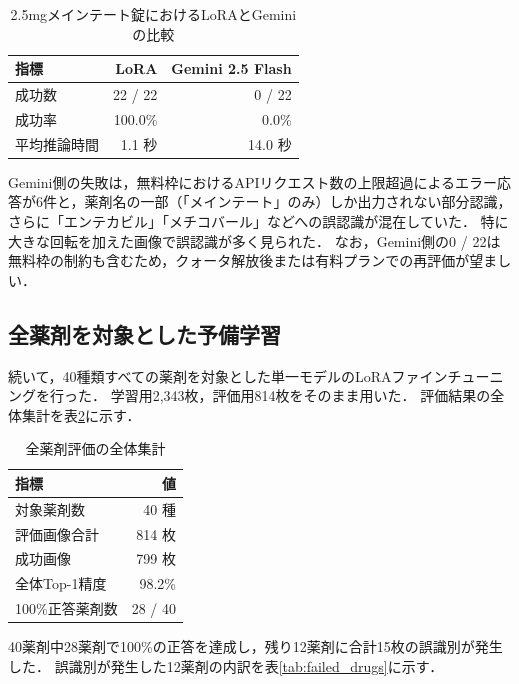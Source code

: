 \documentclass{jsarticle}
\begin{document}
\begin{table}[h]
\centering
\caption{2.5mgメインテート錠におけるLoRAとGeminiの比較}
\label{tab:vs_gemini}
\begin{tabular}{lrr}
\hline
指標 & LoRA & Gemini 2.5 Flash \\
\hline
成功数 & 22 / 22 & 0 / 22 \\
成功率 & 100.0\% & 0.0\% \\
平均推論時間 & 1.1 秒 & 14.0 秒 \\
\hline
\end{tabular}
\end{table}

Gemini側の失敗は，無料枠におけるAPIリクエスト数の上限超過によるエラー応答が6件と，薬剤名の一部（「メインテート」のみ）しか出力されない部分認識，さらに「エンテカビル」「メチコバール」などへの誤認識が混在していた．
特に大きな回転を加えた画像で誤認識が多く見られた．
なお，Gemini側の0 / 22は無料枠の制約も含むため，クォータ解放後または有料プランでの再評価が望ましい．

\subsection{全薬剤を対象とした予備学習}

続いて，40種類すべての薬剤を対象とした単一モデルのLoRAファインチューニングを行った．
学習用2,343枚，評価用814枚をそのまま用いた．
評価結果の全体集計を表\ref{tab:all_drugs_summary}に示す．

\begin{table}[h]
\centering
\caption{全薬剤評価の全体集計}
\label{tab:all_drugs_summary}
\begin{tabular}{lr}
\hline
指標 & 値 \\
\hline
対象薬剤数 & 40 種 \\
評価画像合計 & 814 枚 \\
成功画像 & 799 枚 \\
全体Top-1精度 & 98.2\% \\
100\%正答薬剤数 & 28 / 40 \\
\hline
\end{tabular}
\end{table}

40薬剤中28薬剤で100\%の正答を達成し，残り12薬剤に合計15枚の誤識別が発生した．
誤識別が発生した12薬剤の内訳を表\ref{tab:failed_drugs}に示す．
\end{document}
